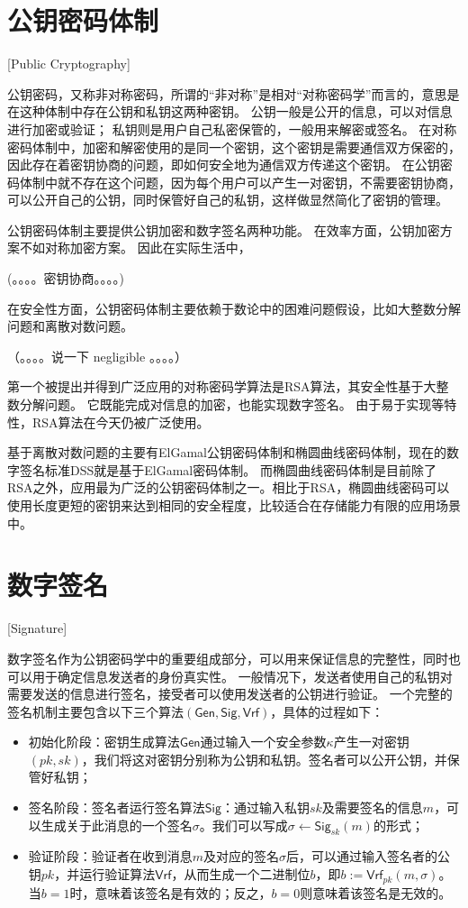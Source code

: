 \section{公钥密码体制}[Public Cryptography]

公钥密码，又称非对称密码，所谓的“非对称”是相对“对称密码学”而言的，意思是在这种体制中存在公钥和私钥这两种密钥。
公钥一般是公开的信息，可以对信息进行加密或验证；
私钥则是用户自己私密保管的，一般用来解密或签名。
在对称密码体制中，加密和解密使用的是同一个密钥，这个密钥是需要通信双方保密的，因此存在着密钥协商的问题，即如何安全地为通信双方传递这个密钥。
在公钥密码体制中就不存在这个问题，因为每个用户可以产生一对密钥，不需要密钥协商，可以公开自己的公钥，同时保管好自己的私钥，这样做显然简化了密钥的管理。

公钥密码体制主要提供公钥加密和数字签名两种功能。
在效率方面，公钥加密方案不如对称加密方案。
因此在实际生活中，

(。。。。密钥协商。。。。)

在安全性方面，公钥密码体制主要依赖于数论中的困难问题假设，比如大整数分解问题和离散对数问题。

（。。。。说一下 negligible 。。。。）

第一个被提出并得到广泛应用的对称密码学算法是RSA算法，其安全性基于大整数分解问题。
它既能完成对信息的加密，也能实现数字签名\cite{rivest1978method}。
由于易于实现等特性，RSA算法在今天仍被广泛使用。

基于离散对数问题的主要有ElGamal公钥密码体制和椭圆曲线密码体制，现在的数字签名标准DSS就是基于ElGamal密码体制。
而椭圆曲线密码体制是目前除了RSA之外，应用最为广泛的公钥密码体制之一。相比于RSA，椭圆曲线密码可以使用长度更短的密钥来达到相同的安全程度，比较适合在存储能力有限的应用场景中。

\section{数字签名}[Signature]

数字签名作为公钥密码学中的重要组成部分，可以用来保证信息的完整性，同时也可以用于确定信息发送者的身份真实性。
一般情况下，发送者使用自己的私钥对需要发送的信息进行签名，接受者可以使用发送者的公钥进行验证。
一个完整的签名机制主要包含以下三个算法$(\mathsf{Gen},\mathsf{Sig},\mathsf{Vrf})$，具体的过程如下：

\begin{itemize}
  \item 初始化阶段：密钥生成算法$\mathsf{Gen}$通过输入一个安全参数$\kappa$产生一对密钥$(pk,sk)$，我们将这对密钥分别称为公钥和私钥。签名者可以公开公钥，并保管好私钥；
  \item 签名阶段：签名者运行签名算法$\mathsf{Sig}$：通过输入私钥$sk$及需要签名的信息$m$，可以生成关于此消息的一个签名$\sigma$。我们可以写成$\sigma\leftarrow \mathsf{Sig}_{sk}(m)$的形式；
  \item 验证阶段：验证者在收到消息$m$及对应的签名$\sigma$后，可以通过输入签名者的公钥$pk$，并运行验证算法$\mathsf{Vrf}$，从而生成一个二进制位$b$，即$b:= \mathsf{Vrf}_{pk}(m,\sigma)$。当$b=1$时，意味着该签名是有效的；反之，$b=0$则意味着该签名是无效的。
\end{itemize}

